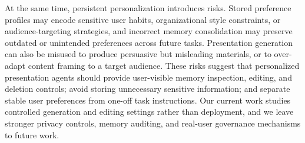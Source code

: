 At the same time, persistent personalization introduces risks. Stored
preference profiles may encode sensitive user habits, organizational style
constraints, or audience-targeting strategies, and incorrect memory
consolidation may preserve outdated or unintended preferences across future
tasks. Presentation generation can also be misused to produce persuasive but
misleading materials, or to over-adapt content framing to a target audience.
These risks suggest that personalized presentation agents should provide
user-visible memory inspection, editing, and deletion controls; avoid storing
unnecessary sensitive information; and separate stable user preferences from
one-off task instructions. Our current work studies controlled generation and
editing settings rather than deployment, and we leave stronger privacy
controls, memory auditing, and real-user governance mechanisms to future work.

\clearpage
